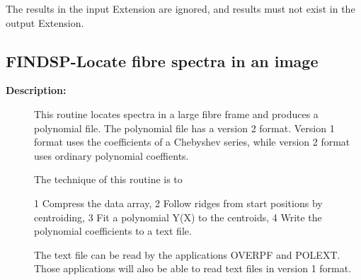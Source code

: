\begin{description}
\begin{description}
The results in the input Extension are ignored, and results
must not exist in the output Extension.
\end{description}
\subsection{FINDSP-\label{FINDSP}Locate fibre spectra in an image}
\begin{description}

\item [\textbf{Description:}]
 This routine locates spectra in a large fibre frame and produces a
 polynomial file. The polynomial file has a version 2 format.
 Version 1 format uses the coefficients of a Chebyshev series,
 while version 2 format uses ordinary polynomial coeffients.

 The technique of this routine is to

    1 Compress the data array,
    2 Follow ridges from start positions by centroiding,
    3 Fit a polynomial Y(X) to the centroids,
    4 Write the polynomial coefficients to a text file.

 The text file can be read by the applications OVERPF and POLEXT.
 Those applications will also be able to read text files in version
 1 format.


\end{description}
\end{description}
